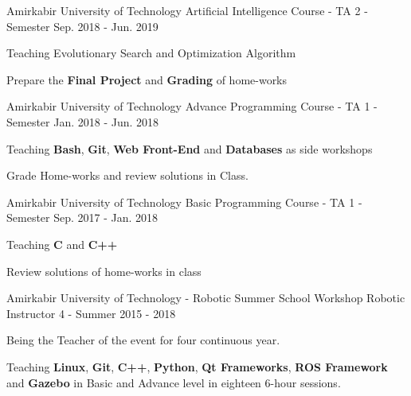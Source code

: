 

\begin{cventries}

  \cventry
    {Amirkabir University of Technology} %
    {Artificial Intelligence Course - TA} %
    {2 - Semester} %
    {Sep. 2018 - Jun. 2019} %
    {
      \begin{cvitems} %
        \item {Teaching Evolutionary Search and Optimization Algorithm}
        \item {Prepare the \textbf{Final Project} and \textbf{Grading} of home-works}
      \end{cvitems}
    }
    
    
\cventry
{Amirkabir University of Technology} %
{Advance Programming Course - TA} %
{1 - Semester} %
{Jan. 2018 - Jun. 2018} %
{
  \begin{cvitems} %
    \item {Teaching \textbf{Bash}, \textbf{Git}, \textbf{Web Front-End} and \textbf{Databases} as side workshops}
    \item {Grade Home-works and review solutions in Class.}
  \end{cvitems}
}


\cventry
{Amirkabir University of Technology} %
{Basic Programming Course - TA} %
{1 - Semester} %
{Sep. 2017 - Jan. 2018} %
{
  \begin{cvitems} %
    \item {Teaching \textbf{C} and \textbf{C++}}
    \item {Review solutions of home-works in class}
  \end{cvitems}
}


  \cventry
    {Amirkabir University of Technology - Robotic Summer School} %
    {Workshop Robotic Instructor} %
    {4 - Summer} %
    {2015 - 2018} %
    {
      \begin{cvitems} %
        \item {Being the Teacher of the event for four continuous year.}
        \item {Teaching \textbf{Linux}, \textbf{Git}, \textbf{C++}, \textbf{Python}, \textbf{Qt Frameworks}, \textbf{ROS Framework} and \textbf{Gazebo} in Basic and Advance level in eighteen 6-hour sessions.}
      \end{cvitems}
    }
    
    



\end{cventries}
